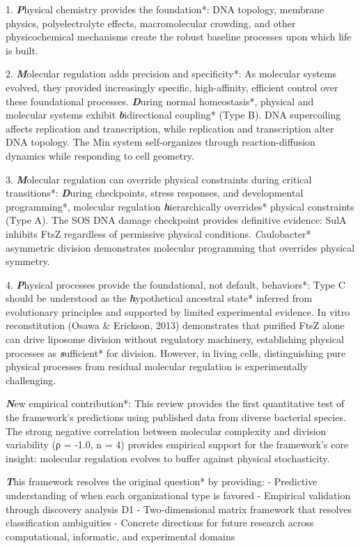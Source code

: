 \documentclass[11pt,a4paper]{article}
\begin{document}
1. \textbf\textit*Physical chemistry provides the foundation*: DNA topology, membrane physics, polyelectrolyte effects, macromolecular crowding, and other physicochemical mechanisms create the robust baseline processes upon which life is built.

2. \textbf\textit*Molecular regulation adds precision and specificity*: As molecular systems evolved, they provided increasingly specific, high-affinity, efficient control over these foundational processes. \textbf\textit*During normal homeostasis*, physical and molecular systems exhibit \textbf\textit*bidirectional coupling* (Type B). DNA supercoiling affects replication and transcription, while replication and transcription alter DNA topology. The Min system self-organizes through reaction-diffusion dynamics while responding to cell geometry.

3. \textbf\textit*Molecular regulation can override physical constraints during critical transitions*: \textbf\textit*During checkpoints, stress responses, and developmental programming*, molecular regulation \textbf\textit*hierarchically overrides* physical constraints (Type A). The SOS DNA damage checkpoint provides definitive evidence: SulA inhibits FtsZ regardless of permissive physical conditions. \textit*Caulobacter* asymmetric division demonstrates molecular programming that overrides physical symmetry.

4. \textbf\textit*Physical processes provide the foundational, not default, behaviors*: Type C should be understood as the \textbf\textit*hypothetical ancestral state* inferred from evolutionary principles and supported by limited experimental evidence. In vitro reconstitution (Osawa & Erickson, 2013) demonstrates that purified FtsZ alone can drive liposome division without regulatory machinery, establishing physical processes as \textbf\textit*sufficient* for division. However, in living cells, distinguishing pure physical processes from residual molecular regulation is experimentally challenging.

\textbf\textit*New empirical contribution*: This review provides the first quantitative test of the framework's predictions using published data from diverse bacterial species. The strong negative correlation between molecular complexity and division variability (ρ = -1.0, n = 4) provides empirical support for the framework's core insight: molecular regulation evolves to buffer against physical stochasticity.

\textbf\textit*This framework resolves the original question* by providing:
- Predictive understanding of when each organizational type is favored
- Empirical validation through discovery analysis D1
- Two-dimensional matrix framework that resolves classification ambiguities
- Concrete directions for future research across computational, informatic, and experimental domains
\end{document}
